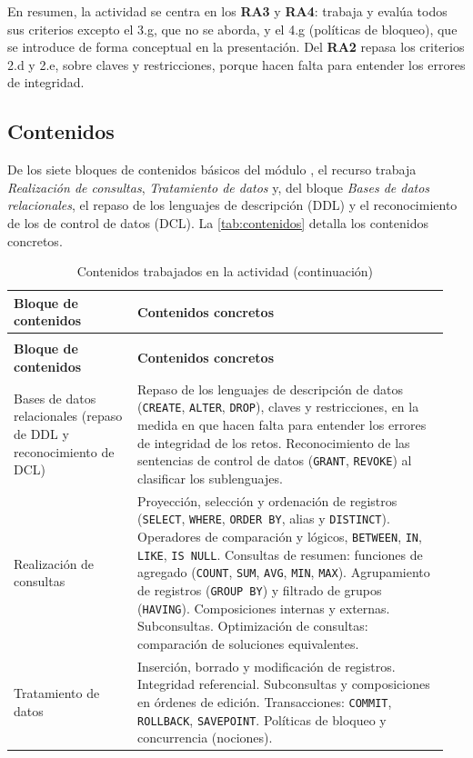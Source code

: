 \documentclass[11pt,a4paper]{article}
\begin{document}
En resumen, la actividad se centra en los \textbf{RA3} y \textbf{RA4}: trabaja y evalúa
todos sus criterios excepto el 3.g, que no se aborda, y el 4.g (políticas de bloqueo), que se
introduce de forma conceptual en la presentación. Del \textbf{RA2} repasa los criterios 2.d y
2.e, sobre claves y restricciones, porque hacen falta para entender los errores de integridad.

\subsection{Contenidos}
\label{sec:contenidos}

De los siete bloques de contenidos básicos del módulo \cite{rd405}, el recurso trabaja
\emph{Realización de consultas}, \emph{Tratamiento de datos} y, del bloque \emph{Bases de datos
relacionales}, el repaso de los lenguajes de descripción (DDL) y el reconocimiento de los de control de datos
(DCL). La
\autoref{tab:contenidos} detalla los contenidos concretos.

\begin{longtable}{@{}p{0.27\linewidth}p{0.68\linewidth}@{}}
\caption{Contenidos trabajados en la actividad}
\label{tab:contenidos}\\
\toprule
\textbf{Bloque de contenidos} & \textbf{Contenidos concretos} \\
\midrule
\endfirsthead
\caption[]{Contenidos trabajados en la actividad (continuación)}\\
\toprule
\textbf{Bloque de contenidos} & \textbf{Contenidos concretos} \\
\midrule
\endhead
\bottomrule
\endfoot
Bases de datos relacionales (repaso de DDL y reconocimiento de DCL) &
Repaso de los lenguajes de descripción de datos (\texttt{CREATE}, \texttt{ALTER},
\texttt{DROP}), claves y restricciones, en la medida en que hacen falta para entender los
errores de integridad de los retos. Reconocimiento de las sentencias de control de datos
(\texttt{GRANT}, \texttt{REVOKE}) al clasificar los sublenguajes. \\
\addlinespace
Realización de consultas &
Proyección, selección y ordenación de registros (\texttt{SELECT}, \texttt{WHERE},
\texttt{ORDER BY}, alias y \texttt{DISTINCT}). Operadores de comparación y lógicos,
\texttt{BETWEEN}, \texttt{IN}, \texttt{LIKE}, \texttt{IS NULL}. Consultas de resumen:
funciones de agregado (\texttt{COUNT}, \texttt{SUM}, \texttt{AVG}, \texttt{MIN},
\texttt{MAX}). Agrupamiento de registros (\texttt{GROUP BY}) y filtrado de grupos
(\texttt{HAVING}). Composiciones internas y externas. Subconsultas. Optimización de
consultas: comparación de soluciones equivalentes. \\
\addlinespace
Tratamiento de datos &
Inserción, borrado y modificación de registros. Integridad referencial. Subconsultas y
composiciones en órdenes de edición. Transacciones: \texttt{COMMIT}, \texttt{ROLLBACK},
\texttt{SAVEPOINT}. Políticas de bloqueo y concurrencia (nociones). \\
\end{longtable}
\end{document}
